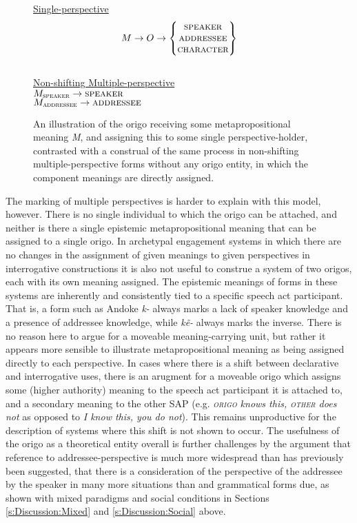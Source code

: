     \begin{figure}
        \centering
\underline{Single-perspective}
\[M \rightarrow O \rightarrow \begin{Bmatrix}
    \textsc{speaker} \\ 
    \textsc{addressee} \\ 
    \textsc{character}
\end{Bmatrix}\] \\

\underline{Non-shifting Multiple-perspective} \\
\(M_{\textsc{speaker}} \rightarrow{\textsc{speaker}}\) \\
\(M_{\textsc{addressee}} \rightarrow{\textsc{addressee}}\)
\caption{An illustration of the origo receiving some metapropositional meaning \textit{M}, and assigning this to some single perspective-holder, contrasted with a construal of the same process in non-shifting multiple-perspective forms without any origo entity, in which the component meanings are directly assigned.}\label{f:Discussion:Origo}
    \end{figure}

The marking of multiple perspectives is harder to explain with this model, however. There is no single individual to which the origo can be attached, and neither is there a single epistemic metapropositional meaning that can be assigned to a single origo. In archetypal engagement systems in which there are no changes in the assignment of given meanings to given perspectives in interrogative constructions it is also not useful to construe a system of two origos, each with its own meaning assigned. The epistemic meanings of forms in these systems are inherently and consistently tied to a specific speech act participant. That is, a form such as Andoke \cite[Isolate: Colombia][117]{EvansBergqvistSanRoque2018a} \textit{k-} always marks a lack of speaker knowledge and a presence of addressee knowledge, while \textit{kẽ-} always marks the inverse. There is no reason here to argue for a moveable meaning-carrying unit, but rather it appears more sensible to illustrate metapropositional meaning as being assigned directly to each perspective. In cases where there is a shift between declarative and interrogative uses, there is an arugment for a moveable origo which assigns some (higher authority) meaning to the speech act participant it is attached to, and a secondary meaning to the other SAP (e.g. \textit{\textsc{origo} knows this, \textsc{other} does not} as opposed to \textit{I know this, you do not}). This remains unproductive for the description of systems where this shift is not shown to occur. The usefulness of the origo as a theoretical entity overall is further challenges by the argument that reference to addressee-perspective is much more widespread than has previously been suggested, that there is a consideration of the perspective of the addressee by the speaker in many more situations than and grammatical forms due, as shown with mixed paradigms and social conditions in Sections \ref{s:Discussion:Mixed} and \ref{s:Discussion:Social} above.

